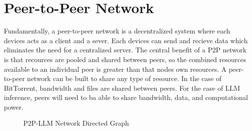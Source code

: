 \documentclass[preprint,twoside,11pt]{article}
\begin{document}
\section{Peer-to-Peer Network}

Fundamentally, a peer-to-peer network is a decentralized system where each devices acts as a client and a sever.
Each devices can send and recieve data which eliminates the need for a centralized server. The central benefit of a P2P network
is that recources are pooled and shared between peers, so the combined resources available to an individual peer is greater than that nodes own resources.
A peer-to-peer network can be built to share any type of resource. In the case of BitTorrent, bandwidth and files are shared between peers.
For the case of LLM inference, peers will need to ba able to share bandwidth, data, and computational power.

\begin{figure}
	\centering
	\caption{P2P-LLM Network Directed Graph}
	\label{fig:layered_graph}
\end{figure}
\end{document}
